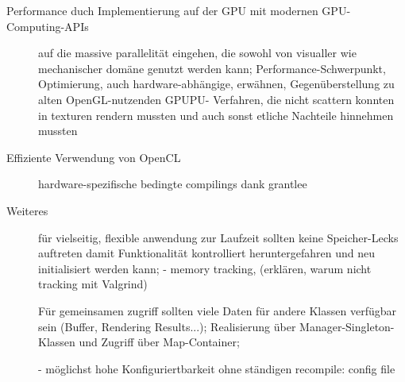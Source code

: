 \begin{description}
	

	\item[Performance duch Implementierung auf der GPU mit modernen GPU-Computing-APIs]
	auf die massive parallelität eingehen, die sowohl von visualler wie mechanischer domäne genutzt werden kann;
	Performance-Schwerpunkt, Optimierung, auch hardware-abhängige, erwähnen, Gegenüberstellung zu alten OpenGL-nutzenden 	
	GPUPU- Verfahren, die nicht scattern konnten in texturen rendern mussten und auch sonst etliche Nachteile hinnehmen 	
	mussten
	
	
	
	\item[Effiziente Verwendung von OpenCL]
	 hardware-spezifische bedingte compilings dank grantlee

	\item[Weiteres]

	 für vielseitig, flexible anwendung zur Laufzeit sollten keine 	Speicher-Lecks auftreten damit Funktionalität 
	 kontrolliert heruntergefahren und neu initialisiert werden kann; 
	 	- memory tracking, (erklären, warum nicht tracking mit Valgrind)
	 
	 Für gemeinsamen zugriff sollten viele Daten für andere Klassen verfügbar sein (Buffer, Rendering Results...); 	
	 Realisierung über Manager-Singleton-Klassen und Zugriff über Map-Container;

	- möglichst hohe Konfiguriertbarkeit ohne ständigen recompile: config file

\end{description}
	
	
\clearpage

